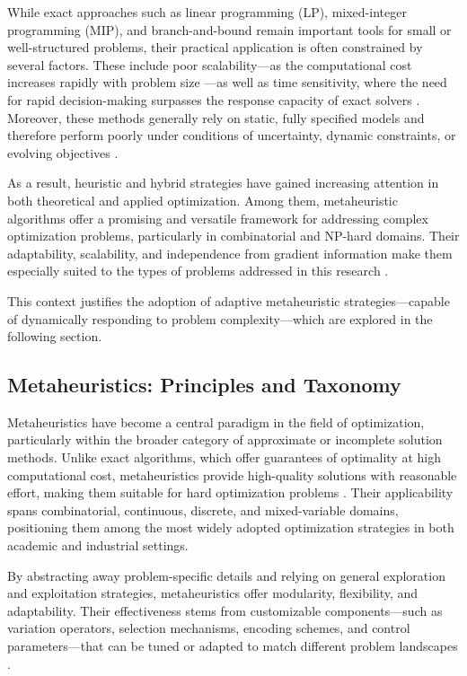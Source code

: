 While exact approaches such as linear programming (LP), mixed-integer programming (MIP), and branch-and-bound remain important tools for small or well-structured problems, their practical application is often constrained by several factors. These include poor scalability—as the computational cost increases rapidly with problem size \parencite{duan2023applications, agung2021performance}—as well as time sensitivity, where the need for rapid decision-making surpasses the response capacity of exact solvers \parencite{jaber2024review}. Moreover, these methods generally rely on static, fully specified models and therefore perform poorly under conditions of uncertainty, dynamic constraints, or evolving objectives \parencite{achamrah2024leveraging}.

As a result, heuristic and hybrid strategies have gained increasing attention in both theoretical and applied optimization. Among them, metaheuristic algorithms offer a promising and versatile framework for addressing complex optimization problems, particularly in combinatorial and NP-hard domains. Their adaptability, scalability, and independence from gradient information make them especially suited to the types of problems addressed in this research \parencite{talbi2009metaheuristics}.

This context justifies the adoption of adaptive metaheuristic strategies—capable of dynamically responding to problem complexity—which are explored in the following section.


\subsection{Metaheuristics: Principles and Taxonomy}

Metaheuristics have become a central paradigm in the field of optimization, particularly within the broader category of approximate or incomplete solution methods. Unlike exact algorithms, which offer guarantees of optimality at high computational cost, metaheuristics provide high-quality solutions with reasonable effort, making them suitable for hard optimization problems \parencite{talbi2009metaheuristics, gendreau2010handbook, sorensen2018history}. Their applicability spans combinatorial, continuous, discrete, and mixed-variable domains, positioning them among the most widely adopted optimization strategies in both academic and industrial settings.

By abstracting away problem-specific details and relying on general exploration and exploitation strategies, metaheuristics offer modularity, flexibility, and adaptability. Their effectiveness stems from customizable components—such as variation operators, selection mechanisms, encoding schemes, and control parameters—that can be tuned or adapted to match different problem landscapes \parencite{glover1986future, tzanetos2020comprehensive}.


